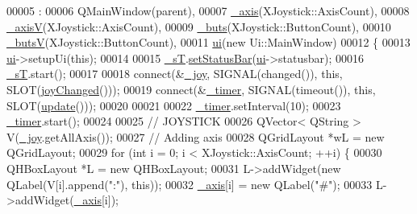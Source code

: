 \begin{DoxyCode}
00005                                       :
00006     QMainWindow(parent),
00007     \hyperlink{class_main_window_a30c99d7a544f74b0650758e5cc7ead5a}{\_axis}(XJoystick::AxisCount),
00008     \hyperlink{class_main_window_a20f66f574ed4c96d8dfc0013e1095f15}{\_axisV}(XJoystick::AxisCount),
00009     \hyperlink{class_main_window_a8eaf474e1b8672f32873ed009e28ce8a}{\_buts}(XJoystick::ButtonCount),
00010     \hyperlink{class_main_window_a519ae4630572cb63fbd04bce12fe8e77}{\_butsV}(XJoystick::ButtonCount),
00011     \hyperlink{class_main_window_a35466a70ed47252a0191168126a352a5}{ui}(\textcolor{keyword}{new} Ui::MainWindow)
00012 \{
00013     \hyperlink{class_main_window_a35466a70ed47252a0191168126a352a5}{ui}->setupUi(\textcolor{keyword}{this});
00014     
00015     \hyperlink{class_main_window_a97f8ecc7ecb930b796178cef7b975013}{\_sT}.\hyperlink{class_servo_thread_a2d05e011577cf2783978a9837114e29e}{setStatusBar}(\hyperlink{class_main_window_a35466a70ed47252a0191168126a352a5}{ui}->statusbar);
00016     \hyperlink{class_main_window_a97f8ecc7ecb930b796178cef7b975013}{\_sT}.start();
00017     
00018     connect(&\hyperlink{class_main_window_a671f35800890e518713e1946671d8730}{\_joy}, SIGNAL(changed()), \textcolor{keyword}{this}, SLOT(\hyperlink{class_main_window_abb4c2d8a79c9f80010ea031366bf8226}{joyChanged}()));
00019     connect(&\hyperlink{class_main_window_a254b03b878cfda75c1c411a2f8568d33}{\_timer}, SIGNAL(timeout()), \textcolor{keyword}{this}, SLOT(\hyperlink{class_main_window_a128f71880d4b9683149023fc46fcc9f8}{update}()));
00020     
00021     
00022     \hyperlink{class_main_window_a254b03b878cfda75c1c411a2f8568d33}{\_timer}.setInterval(10);
00023     \hyperlink{class_main_window_a254b03b878cfda75c1c411a2f8568d33}{\_timer}.start();
00024     
00025     \textcolor{comment}{// JOYSTICK}
00026     QVector< QString > V(\hyperlink{class_main_window_a671f35800890e518713e1946671d8730}{\_joy}.getAllAxis());
00027     \textcolor{comment}{// Adding axis}
00028     QGridLayout *wL = \textcolor{keyword}{new} QGridLayout;
00029     \textcolor{keywordflow}{for} (\textcolor{keywordtype}{int} i = 0; i < XJoystick::AxisCount; ++i) \{
00030         QHBoxLayout *L = \textcolor{keyword}{new} QHBoxLayout;
00031         L->addWidget(\textcolor{keyword}{new} QLabel(V[i].append(\textcolor{stringliteral}{":"}), \textcolor{keyword}{this}));
00032         \hyperlink{class_main_window_a30c99d7a544f74b0650758e5cc7ead5a}{\_axis}[i] = \textcolor{keyword}{new} QLabel(\textcolor{stringliteral}{"#"});
00033         L->addWidget(\hyperlink{class_main_window_a30c99d7a544f74b0650758e5cc7ead5a}{\_axis}[i]);

\end{DoxyCode}
